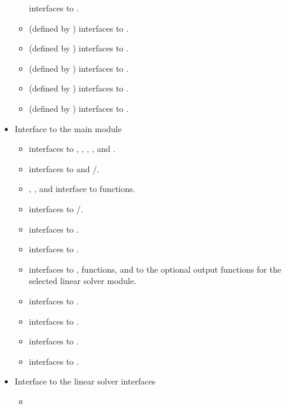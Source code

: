 \begin{itemize}
\begin{itemize}
    interfaces to .
  \item {} (defined by {\sunlinsolspbcgs}) 
    interfaces to .
  \item {} (defined by {\sunlinsolspfgmr}) 
    interfaces to .
  \item {} (defined by {\sunlinsolspgmr}) 
    interfaces to .
  \item {} (defined by {\sunlinsolsptfqmr}) 
    interfaces to .
  \item {} (defined by {\sunlinsolslumt}) 
    interfaces to .
  \end{itemize}
\item Interface to the main {\ida} module
  \begin{itemize}
  \item {}
    interfaces to , , ,
    , and .
  \item {}
    interfaces to  and /.
  \item {}, , and 
    interface to  functions.    
  \item {}
    interfaces to /.
  \item {}
    interfaces to .
  \item {}
    interfaces to .
  \item {}
    interfaces to ,  functions, and to the optional
    output functions for the selected linear solver module.
  \item {}
    interfaces to .
  \item {}
    interfaces to .
  \item {}
    interfaces to .
  \item {}    
    interfaces to .
  \end{itemize}
\item Interface to the linear solver interfaces
  \begin{itemize}
  \item {}    

\end{itemize}
\end{itemize}
